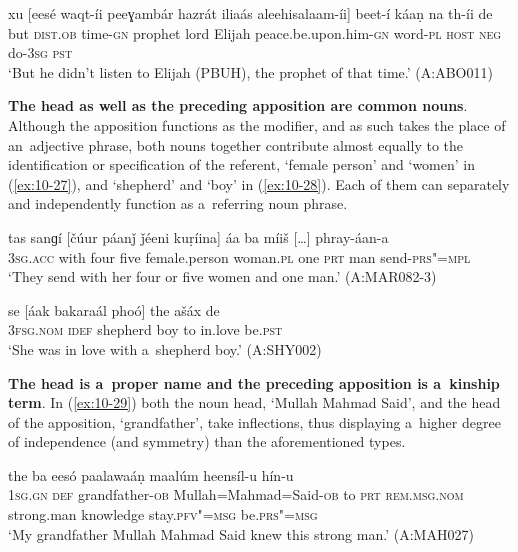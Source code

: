 \begin{exe}
\ex
\label{ex:10-26}
\gll xu [eesé waqt-íi peeɣambár hazrát iliaás aleehisalaam-íi] beet-í káaṇ na th-íi de \\
but \textsc{dist.ob} time-\textsc{gn} prophet lord  Elijah peace.be.upon.him-\textsc{gn} 
word-\textsc{pl} \textsc{host} \textsc{neg} do-\textsc{3sg} \textsc{pst} \\
\glt `But he didn't listen to Elijah (PBUH), the prophet of that time.' (A:ABO011)
\end{exe}

\textbf{The head as well as the preceding apposition are common nouns}. Although the apposition functions as the modifier, and as such takes the place of an~adjective phrase, both nouns together contribute almost equally to the identification or specification of the referent, `female person' and `women' in (\ref{ex:10-27}), and `shepherd' and `boy' in (\ref{ex:10-28}). Each of them can separately and independently function as a~referring noun phrase. 

\begin{exe}
\ex
\label{ex:10-27}
\gll tas sanɡí [čúur páanǰ ǰéeni kuṛíina] áa ba míiš [{\ldots}] phray-áan-a \\
\textsc{3sg.acc} with four five female.person woman.\textsc{pl}  one \textsc{prt} man {} send-\textsc{prs"=mpl} \\
\glt `They send with her four or five women and one man.' (A:MAR082-3)

\ex
\label{ex:10-28}
\gll se [áak bakaraál phoó] the ašáx de  \\
\textsc{3fsg.nom} \textsc{idef} shepherd boy to in.love be.\textsc{pst}  \\
\glt `She was in love with a~shepherd boy.' (A:SHY002)
\end{exe}

\textbf{The head is a~proper name and the preceding apposition is a~kinship term}. In (\ref{ex:10-29}) both the noun head, `Mullah Mahmad Said', and the head of the apposition, `grandfather', take inflections, thus displaying a~higher degree of independence (and symmetry) than the aforementioned types. 

\begin{exe}
\ex
\label{ex:10-29}
\gll [míi se dóod-a mulaa=mhaamad=seed-á] the ba eesó paalawaáṇ maalúm heensíl-u hín-u \\
\textsc{1sg.gn} \textsc{def} grandfather-\textsc{ob} Mullah=Mahmad=Said-\textsc{ob} to  \textsc{prt} \textsc{rem.msg.nom} strong.man knowledge  stay.\textsc{pfv"=msg} be.\textsc{prs"=msg}  \\
\glt `My grandfather Mullah Mahmad Said knew this strong man.' (A:MAH027)
\end{exe}


